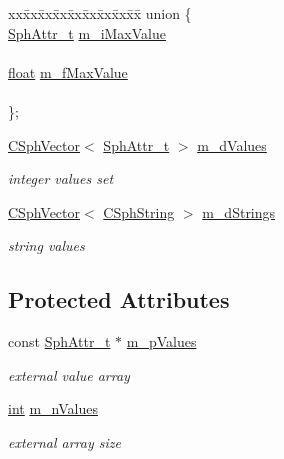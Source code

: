 \begin{DoxyCompactItemize}
\begin{tabbing}
\end{tabbing}\item 
\begin{tabbing}
xx\=xx\=xx\=xx\=xx\=xx\=xx\=xx\=xx\=\kill
union \{\\
\>\hyperlink{sphinx_8h_a7c122d91b0b52a0214ba176636bb1561}{SphAttr\_t} \hyperlink{classCSphFilterSettings_a02b61305bfbc6ae22f0d7bcb0c4ec8b0}{m\_iMaxValue}\\
\>\\
\>\hyperlink{sphinxexpr_8cpp_a0e0d0739f7035f18f949c2db2c6759ec}{float} \hyperlink{classCSphFilterSettings_a74624f4727af1cbdec318a3cb967d53f}{m\_fMaxValue}\\
\>\\
\}; \\

\end{tabbing}\item 
\hyperlink{classCSphVector}{C\-Sph\-Vector}$<$ \hyperlink{sphinx_8h_a7c122d91b0b52a0214ba176636bb1561}{Sph\-Attr\-\_\-t} $>$ \hyperlink{classCSphFilterSettings_a7a260ca2d244d25258227df1e108feb5}{m\-\_\-d\-Values}
\begin{DoxyCompactList}\small\item\em integer values set \end{DoxyCompactList}\item 
\hyperlink{classCSphVector}{C\-Sph\-Vector}$<$ \hyperlink{structCSphString}{C\-Sph\-String} $>$ \hyperlink{classCSphFilterSettings_a7ec760e655bf9c839678d09bd7a99278}{m\-\_\-d\-Strings}
\begin{DoxyCompactList}\small\item\em string values \end{DoxyCompactList}\end{DoxyCompactItemize}
\subsection*{Protected Attributes}
\begin{DoxyCompactItemize}
\item 
const \hyperlink{sphinx_8h_a7c122d91b0b52a0214ba176636bb1561}{Sph\-Attr\-\_\-t} $\ast$ \hyperlink{classCSphFilterSettings_a09a650d5454c6c53380ab6dd37289d9f}{m\-\_\-p\-Values}
\begin{DoxyCompactList}\small\item\em external value array \end{DoxyCompactList}\item 
\hyperlink{sphinxexpr_8cpp_a4a26e8f9cb8b736e0c4cbf4d16de985e}{int} \hyperlink{classCSphFilterSettings_a24cf7c8652d45573747ce5b11e727681}{m\-\_\-n\-Values}
\begin{DoxyCompactList}\small\item\em external array size \end{DoxyCompactList}\end{DoxyCompactItemize}


